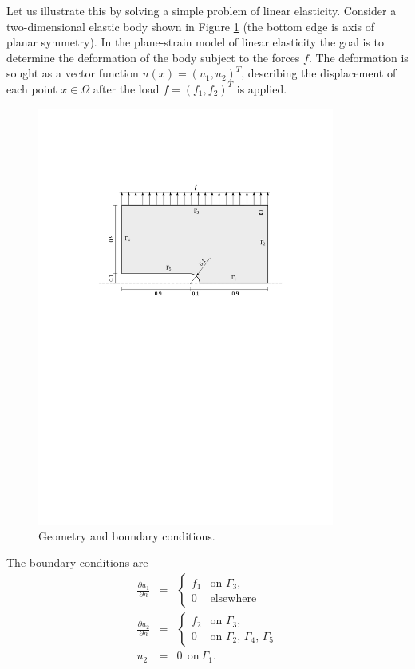 \documentclass[11pt]{article}
\newcommand{\dd}[2]{\frac{\partial #1}{\partial #2}}
\begin{document}
Let us illustrate this by solving a simple problem of linear elasticity. Consider a
two-dimensional elastic body shown in Figure \ref{elastsample} (the bottom edge is
axis of planar symmetry).
In the plane-strain model of linear elasticity the goal is to determine the
deformation of the body subject to the forces $f$. The deformation is sought
as a vector function $u(x) = (u_1, u_2)^T$, describing the displacement of each point
$x \in \Omega$ after the load $f = (f_1, f_2)^T$ is applied.

\begin{figure}[!ht]
  \vspace{-2mm}
  \medskip\centering
  \includegraphics[width=0.87\textwidth]{img/elastsample}
  \caption{Geometry and boundary conditions.}
  \label{elastsample}
\end{figure}

The boundary conditions are
\begin{eqnarray}
  \dd{u_1}{n} &=&
  \begin{cases}
    f_1 & \text{on $\Gamma_3$,}\\
    0   & \text{elsewhere}
  \end{cases}\label{elastbc1}
  \\
  \dd{u_2}{n} &=&
  \begin{cases}
    f_2 & \text{on $\Gamma_3$,}\\
    0   & \text{on $\Gamma_2$, $\Gamma_4$, $\Gamma_5$}
  \end{cases}\label{elastbc2}
  \\[2mm]
  u_2 &=& 0 \ \ \mbox{on} \ \Gamma_1. \label{elastbc3}
\end{eqnarray}
\end{document}

